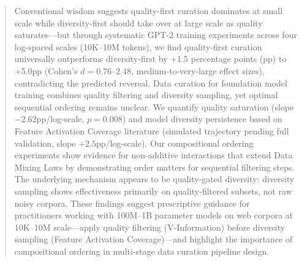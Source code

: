 \begin{abstract}
Conventional wisdom suggests quality-first curation dominates at small scale while diversity-first should take over at large scale as quality saturates---but through systematic GPT-2 training experiments across four log-spaced scales (10K--10M tokens), we find quality-first curation universally outperforms diversity-first by +1.5 percentage points (pp) to +5.0pp (Cohen's $d=0.76$--$2.48$, medium-to-very-large effect sizes), contradicting the predicted reversal. Data curation for foundation model training combines quality filtering and diversity sampling, yet optimal sequential ordering remains unclear. We quantify quality saturation (slope $-2.62$pp/log-scale, $p=0.008$) and model diversity persistence based on Feature Activation Coverage literature (simulated trajectory pending full validation, slope $+2.5$pp/log-scale). Our compositional ordering experiments show evidence for non-additive interactions that extend Data Mixing Laws by demonstrating order matters for sequential filtering steps. The underlying mechanism appears to be quality-gated diversity: diversity sampling shows effectiveness primarily on quality-filtered subsets, not raw noisy corpora. These findings suggest prescriptive guidance for practitioners working with 100M--1B parameter models on web corpora at 10K--10M scale---apply quality filtering (V-Information) before diversity sampling (Feature Activation Coverage)---and highlight the importance of compositional ordering in multi-stage data curation pipeline design.
\end{abstract}
